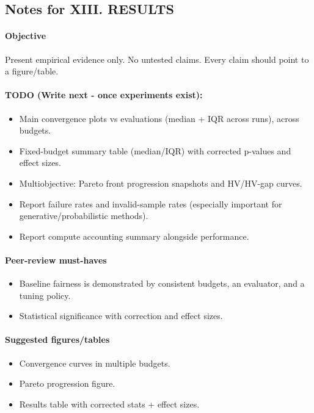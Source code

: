 \subsection*{Notes for XIII. RESULTS}
\paragraph{Objective}
Present empirical evidence only. No untested claims. Every claim should point to a figure/table.

\paragraph{TODO (Write next - once experiments exist):}
\begin{itemize}
  \item Main convergence plots vs evaluations (median + IQR across runs), across budgets.
  \item Fixed-budget summary table (median/IQR) with corrected p-values and effect sizes.
  \item Multiobjective: Pareto front progression snapshots and HV/HV-gap curves.
  \item Report failure rates and invalid-sample rates (especially important for generative/probabilistic methods).
  \item Report compute accounting summary alongside performance.
\end{itemize}

\paragraph{Peer-review must-haves}
\begin{itemize}
  \item Baseline fairness is demonstrated by consistent budgets, an evaluator, and a tuning policy.
  \item Statistical significance with correction and effect sizes.
\end{itemize}

\paragraph{Suggested figures/tables}
\begin{itemize}
  \item Convergence curves in multiple budgets.
  \item Pareto progression figure.
  \item Results table with corrected stats + effect sizes.
\end{itemize}
